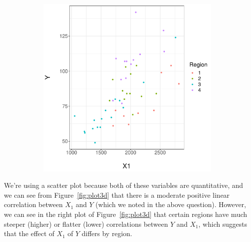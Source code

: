 \documentclass[12pt,letterpaper]{article}
\begin{document}
\begin{figure}[h!]
\begin{subfigure}[t]{0.5\textwidth}
		\includegraphics[width=0.99\textwidth]{plot_3d2.pdf}

	\end{subfigure}

\end{figure}

\noindent We're using a scatter plot because both of these variables are quantitative, and we can see from Figure~\ref{fig:plot3d} that there is a moderate positive linear correlation between $X_1$ and $Y$ (which we noted in the above question). However, we can see in the right plot of Figure~\ref{fig:plot3d} that certain regions have much steeper (higher) or flatter (lower) correlations between $Y$ and $X_1$, which suggests that the effect of $X_1$ of $Y$ differs by region.
\end{document}
